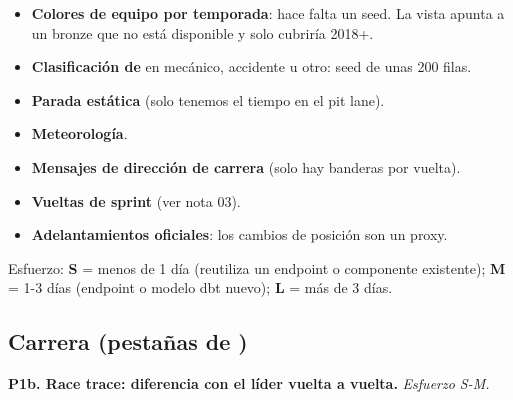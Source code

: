 \begin{itemize}
\item \textbf{Colores de equipo por temporada}: hace falta un seed. La vista  apunta a un bronze que no está disponible y solo cubriría 2018+.
\item \textbf{Clasificación de } en mecánico, accidente u otro: seed de unas 200 filas.
\item \textbf{Parada estática} (solo tenemos el tiempo en el pit lane).
\item \textbf{Meteorología}.
\item \textbf{Mensajes de dirección de carrera} (solo hay banderas por vuelta).
\item \textbf{Vueltas de sprint} (ver nota 03).
\item \textbf{Adelantamientos oficiales}: los cambios de posición son un proxy.
\end{itemize}

Esfuerzo: \textbf{S} = menos de 1 día (reutiliza un endpoint o componente existente); \textbf{M} = 1-3 días (endpoint o modelo dbt nuevo); \textbf{L} = más de 3 días.

\subsection{Carrera (pestañas de )}

\textbf{P1b. Race trace: diferencia con el líder vuelta a vuelta.} \emph{Esfuerzo S-M.}

